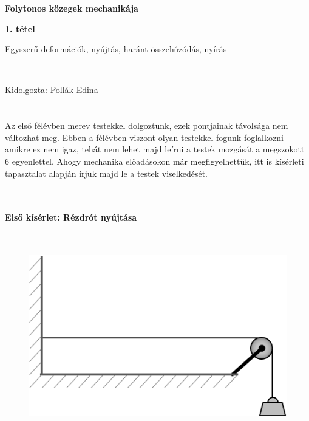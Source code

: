\documentclass[a4paper, 12pt]{article}
\begin{document}
\begin{titlepage}\centering
\vspace*{250 pt}
\Huge \textbf{Folytonos közegek mechanikája}

\LARGE \textbf{1. tétel}

\LARGE Egyszerű deformációk, nyújtás, haránt összehúzódás, nyírás


~

\LARGE Kidolgozta: Pollák Edina

\vspace*{\fill}
\end{titlepage}

\newpage
\part*{\Large{}}

\vspace{30 pt}

Az első félévben merev testekkel dolgoztunk, ezek pontjainak távolsága nem változhat meg. Ebben a félévben viszont olyan testekkel fogunk foglalkozni amikre ez nem igaz, tehát nem lehet majd leírni a testek mozgását a megszokott 6 egyenlettel. Ahogy mechanika előadásokon már megfigyelhettük, itt is kísérleti tapasztalat alapján írjuk majd le a testek viselkedését.

~

\subsection*{Első kísérlet: Rézdrót nyújtása}

~

\begin{figure}[h]
\centering
\includegraphics[scale=0.5]{tetel1_1.png}
\caption{}
\end{figure}
\end{document}
